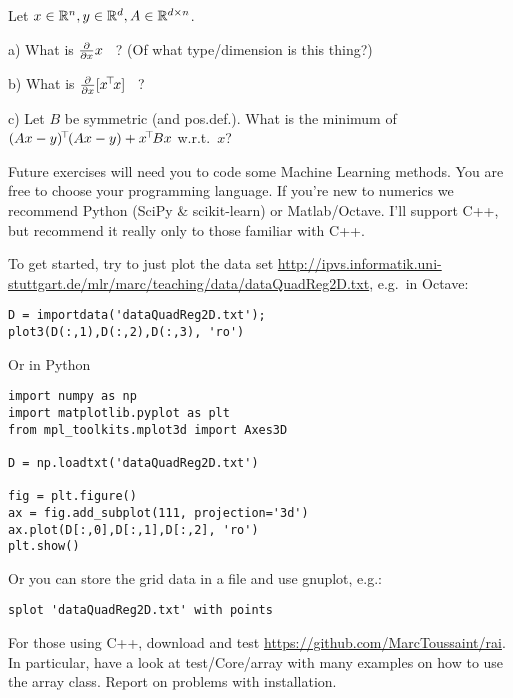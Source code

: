 
Let $x\in{\mathbb{R}}^n,y\in{\mathbb{R}}^d,A\in{\mathbb{R}}^{d\times n}$.

a) What is $\frac{\partial}{\partial x} x$ ~? (Of what type/dimension is this thing?)

b) What is $\frac{\partial}{\partial x}[x^{\!\top\!} x]$ ~?

c) Let $B$ be symmetric (and pos.def.). What is the minimum of $(Ax -
y)^{\!\top\!} (Ax - y) + x^{\!\top\!} B x$ w.r.t.\ $x$?



Future exercises will need you to code some Machine Learning
methods. You are free to choose your programming language. If you're
new to numerics we recommend Python (SciPy \&
scikit-learn) or Matlab/Octave.  I'll support C++, but recommend it really only to
those familiar with C++.

To get started, try to just plot the data set {\small\url{http://ipvs.informatik.uni-stuttgart.de/mlr/marc/teaching/data/dataQuadReg2D.txt}}, e.g.\ in Octave:\\
\quad\begin{code}
\begin{verbatim}
D = importdata('dataQuadReg2D.txt');
plot3(D(:,1),D(:,2),D(:,3), 'ro')
\end{verbatim}
\end{code}
Or in Python\\
\quad\begin{code}
\begin{verbatim}
import numpy as np
import matplotlib.pyplot as plt
from mpl_toolkits.mplot3d import Axes3D

D = np.loadtxt('dataQuadReg2D.txt')

fig = plt.figure()
ax = fig.add_subplot(111, projection='3d')
ax.plot(D[:,0],D[:,1],D[:,2], 'ro')
plt.show()
\end{verbatim}
\end{code}
Or you can store the grid data in a file and use gnuplot, e.g.:\\
\begin{code}
\begin{verbatim}
splot 'dataQuadReg2D.txt' with points
\end{verbatim}
\end{code}


For those using C++, download and test {\small\url{https://github.com/MarcToussaint/rai}}. In
particular, have a look at test/Core/array with
many examples on how to use the array class. Report on problems with
installation.

\exerfoot

